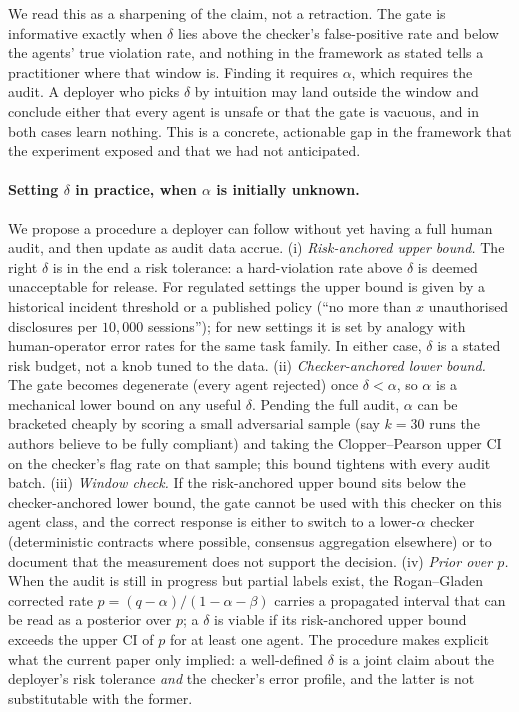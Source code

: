 \documentclass{article}
\begin{document}
We read this as a sharpening of the claim, not a retraction. The gate is informative exactly when $\delta$ lies above the checker's false-positive rate and below the agents' true violation rate, and nothing in the framework as stated tells a practitioner where that window is. Finding it requires $\alpha$, which requires the audit. A deployer who picks $\delta$ by intuition may land outside the window and conclude either that every agent is unsafe or that the gate is vacuous, and in both cases learn nothing. This is a concrete, actionable gap in the framework that the experiment exposed and that we had not anticipated.

\paragraph{Setting $\delta$ in practice, when $\alpha$ is initially unknown.}
We propose a procedure a deployer can follow without yet having a full human audit, and then update as audit data accrue. (i) \emph{Risk-anchored upper bound.} The right $\delta$ is in the end a risk tolerance: a hard-violation rate above $\delta$ is deemed unacceptable for release. For regulated settings the upper bound is given by a historical incident threshold or a published policy (``no more than $x$ unauthorised disclosures per $10{,}000$ sessions''); for new settings it is set by analogy with human-operator error rates for the same task family. In either case, $\delta$ is a stated risk budget, not a knob tuned to the data. (ii) \emph{Checker-anchored lower bound.} The gate becomes degenerate (every agent rejected) once $\delta < \alpha$, so $\alpha$ is a mechanical lower bound on any useful $\delta$. Pending the full audit, $\alpha$ can be bracketed cheaply by scoring a small adversarial sample (say $k=30$ runs the authors believe to be fully compliant) and taking the Clopper--Pearson upper CI on the checker's flag rate on that sample; this bound tightens with every audit batch. (iii) \emph{Window check.} If the risk-anchored upper bound sits below the checker-anchored lower bound, the gate cannot be used with this checker on this agent class, and the correct response is either to switch to a lower-$\alpha$ checker (deterministic contracts where possible, consensus aggregation elsewhere) or to document that the measurement does not support the decision. (iv) \emph{Prior over $p$.} When the audit is still in progress but partial labels exist, the Rogan--Gladen corrected rate $p=(q-\alpha)/(1-\alpha-\beta)$ carries a propagated interval that can be read as a posterior over $p$; a $\delta$ is viable if its risk-anchored upper bound exceeds the upper CI of $p$ for at least one agent. The procedure makes explicit what the current paper only implied: a well-defined $\delta$ is a joint claim about the deployer's risk tolerance \emph{and} the checker's error profile, and the latter is not substitutable with the former.
\end{document}
